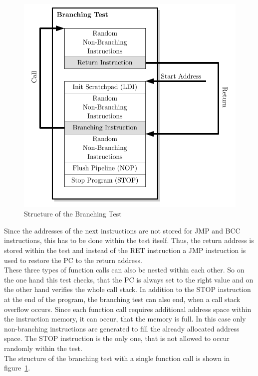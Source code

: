 \begin{figure}[htb]
 \centering
 \includegraphics[scale=1.0]{images/branching_test}
 \caption{Structure of the Branching Test}
\label{fig:branching_test}
\end{figure}

Since the addresses of the next instructions are not stored for JMP and BCC instructions, this has to be done within the test itself.
Thus, the return address is stored within the test and instead of the RET instruction a JMP instruction is used to restore the PC to the return address.\\
These three types of function calls can also be nested within each other. 
So on the one hand this test checks, that the PC is always set to the right value and on the other hand verifies the whole call stack.
In addition to the STOP instruction at the end of the program, the branching test can also end, when a call stack overflow occurs.
Since each function call requires additional address space within the instruction memory, it can occur, that the memory is full.
In this case only non-branching instructions are generated to fill the already allocated address space.
The STOP instruction is the only one, that is not allowed to occur randomly within the test.\\
The structure of the branching test with a single function call is shown in figure~\ref{fig:branching_test}.



